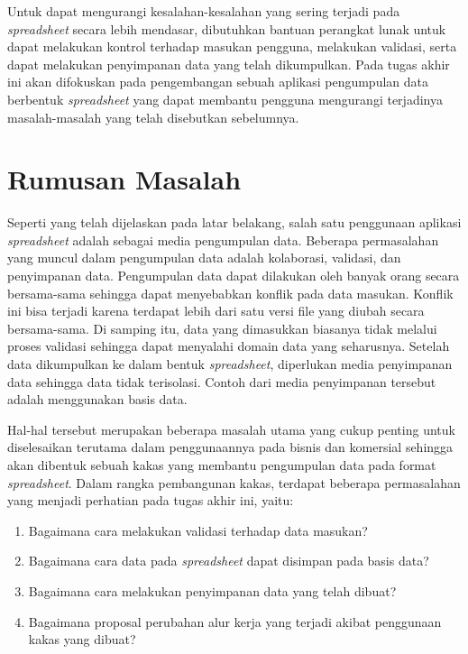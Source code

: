 Untuk dapat mengurangi kesalahan-kesalahan yang sering terjadi pada \textit{spreadsheet} secara lebih mendasar, dibutuhkan bantuan perangkat lunak untuk dapat melakukan kontrol terhadap masukan pengguna, melakukan validasi, serta dapat melakukan penyimpanan data yang telah dikumpulkan. Pada tugas akhir ini akan difokuskan pada pengembangan sebuah aplikasi pengumpulan data berbentuk \textit{spreadsheet} yang dapat membantu pengguna mengurangi terjadinya masalah-masalah yang telah disebutkan sebelumnya.

\section{Rumusan Masalah}\label{RumusanMasalah}

Seperti yang telah dijelaskan pada latar belakang, salah satu penggunaan aplikasi \textit{spreadsheet} adalah sebagai media pengumpulan data. Beberapa permasalahan yang muncul dalam pengumpulan data adalah kolaborasi, validasi, dan penyimpanan data. Pengumpulan data dapat dilakukan oleh banyak orang secara bersama-sama sehingga dapat menyebabkan konflik pada data masukan. Konflik ini bisa terjadi karena terdapat lebih dari satu versi file yang diubah secara bersama-sama. Di samping itu, data yang dimasukkan biasanya tidak melalui proses validasi sehingga dapat menyalahi domain data yang seharusnya. Setelah data dikumpulkan ke dalam bentuk \textit{spreadsheet}, diperlukan media penyimpanan data sehingga data tidak terisolasi. Contoh dari media penyimpanan tersebut adalah menggunakan basis data.

Hal-hal tersebut merupakan beberapa masalah utama yang cukup penting untuk diselesaikan terutama dalam penggunaannya pada bisnis dan komersial sehingga akan dibentuk sebuah kakas yang membantu pengumpulan data pada format \textit{spreadsheet}. Dalam rangka pembangunan kakas, terdapat beberapa permasalahan yang menjadi perhatian pada tugas akhir ini, yaitu:

\begin{enumerate}
    \item Bagaimana cara melakukan validasi terhadap data masukan?
    \item Bagaimana cara data pada \textit{spreadsheet} dapat disimpan pada basis data?
    \item Bagaimana cara melakukan penyimpanan data yang telah dibuat?
    \item Bagaimana proposal perubahan alur kerja yang terjadi akibat penggunaan kakas yang dibuat?
\end{enumerate}

